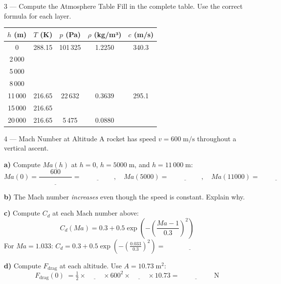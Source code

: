 \documentclass[12pt, a4paper]{article}
\begin{document}
\begin{exercisebox}{3 — Compute the Atmosphere Table}
Fill in the complete table. Use the correct formula for each layer.

\begin{center}
\renewcommand{\arraystretch}{1.5}
\begin{tabular}{|c|c|c|c|c|}
\hline
$h$ (m) & $T$ (K) & $p$ (Pa) & $\rho$ (kg/m³) & $c$ (m/s) \\
\hline
0       & 288.15 & 101\,325 & 1.2250 & 340.3 \\
\hline
2\,000  & & & & \\
\hline
5\,000  & & & & \\
\hline
8\,000  & & & & \\
\hline
11\,000 & 216.65 & 22\,632 & 0.3639 & 295.1 \\
\hline
15\,000 & 216.65 & & & \\
\hline
20\,000 & 216.65 & 5\,475 & 0.0880 & \\
\hline
\end{tabular}
\end{center}
\end{exercisebox}

\begin{solutionspace}[6cm]
\end{solutionspace}

\begin{exercisebox}{4 — Mach Number at Altitude}
A rocket has speed $v = 600\;\text{m/s}$ throughout a vertical ascent.

\textbf{a)} Compute $Ma(h)$ at $h = 0$, $h = 5000\;\text{m}$, and $h = 11\,000\;\text{m}$:
\[
  Ma(0) = \frac{600}{\underline{\hspace{2cm}}} = \underline{\hspace{2cm}}, \quad
  Ma(5000) = \underline{\hspace{2cm}}, \quad
  Ma(11000) = \underline{\hspace{2cm}}
\]

\textbf{b)} The Mach number \textit{increases} even though the speed is constant. Explain why.

\textbf{c)} Compute $C_d$ at each Mach number above:
\[
  C_d(Ma) = 0.3 + 0.5\exp\!\left(-\left(\frac{Ma-1}{0.3}\right)^2\right)
\]
For $Ma = 1.033$: $C_d = 0.3 + 0.5\exp\left(-\left(\frac{0.033}{0.3}\right)^2\right) = \underline{\hspace{3cm}}$

\textbf{d)} Compute $F_\text{drag}$ at each altitude. Use $A = 10.73\;\text{m}^2$:
\[
  F_\text{drag}(0)\; = \tfrac{1}{2} \times \underline{\hspace{1cm}} \times 600^2 \times \underline{\hspace{1cm}} \times 10.73 = \underline{\hspace{2cm}}\;\text{N}
\]
\end{exercisebox}
\end{document}
